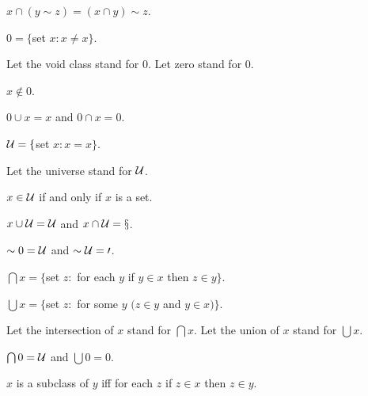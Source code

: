 \documentclass[a4paper,draft]{amsproc}
\begin{document}
\begin{forthel}
\begin{theorem}
$x \cap (y \sim z) = (x \cap y) \sim z$.
\end{theorem}

\begin{definition} $0 = \{$set $x : x \neq x\}$.\end{definition}
Let the void class stand for $0$.
Let zero stand for $0$.

\begin{theorem}
$x \notin 0$.
\end{theorem}

\begin{theorem}
$0 \cup x = x$ and $0 \cap x = 0$.
\end{theorem}

\begin{definition} $\cal{U} = \{$set $x : x = x\}$.\end{definition}
Let the universe stand for $\cal{U}$.

\begin{theorem}
$x \in \cal{U}$ if and only if $x$ is a set.
\end{theorem}

\begin{theorem}
$x \cup \cal{U} = \cal{U}$ and $x \cap \cal{U} = x$.
\end{theorem}

\begin{theorem}
$\sim 0 = \cal{U}$ and $\sim \cal{U} = 0$.
\end{theorem}

\begin{definition} $\bigcap x = 
\{$set $z :$ for each $y$ if $y \in x$ then $z \in y\}$.\end{definition}

\begin{definition} $\bigcup x = 
\{$set $z :$ for some $y$ $(z \in y$ and $y \in x)\}$.\end{definition}

Let the intersection of $x$ stand for $\bigcap x$.
Let the union of $x$ stand for $\bigcup x$.

\begin{theorem}
$\bigcap 0 = \cal{U}$ and $\bigcup 0 = 0$.
\end{theorem}

\begin{definition} $x$ is a subclass of $y$ iff 
for each $z$ if $z \in x$ then $z \in y$.
\end{definition}


\end{forthel}
\end{document}
